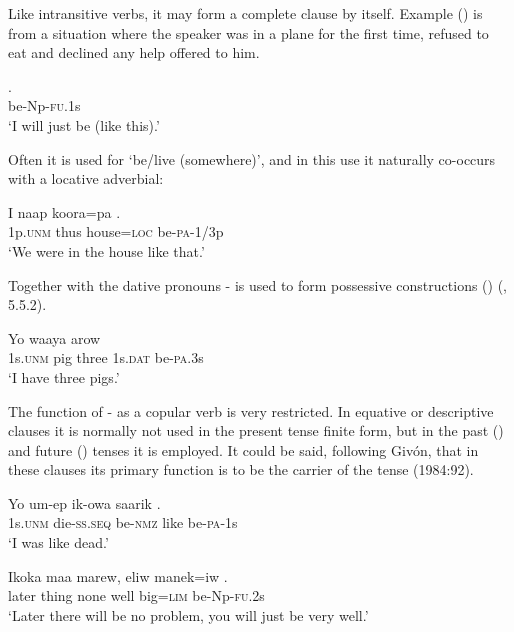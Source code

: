Like intransitive verbs, it may form a complete clause by itself. Example () is from a situation where the speaker was in a plane for the first time, refused to eat and declined any help offered to him.

\ea%
\label{ex:x1455}
\gll {}. \\
be-Np-\textsc{fu}.1s\\
\glt`I will just be (like this).'
\z

Often it is used for `be/live (somewhere)', and in this use it naturally co-occurs with a locative adverbial:

\ea%
\label{ex:x497}
\gll I naap koora=pa . \\
1p.\textsc{unm} thus house=\textsc{loc} be-\textsc{pa}-1/3p\\
\glt`We were in the house like that.'
\z

Together with the dative pronouns - is used to form possessive constructions () (, 5.5.2). 

\ea%
\label{ex:x258}
\gll Yo waaya arow   \\
1s.\textsc{unm} pig three 1s.\textsc{dat} be-\textsc{pa}.3s \\
\glt`I have three pigs.'
\z

The function of - as a copular verb is very restricted. In equative or descriptive clauses it is normally not used in the present tense finite form, but in the past () and future () tenses it is employed. It could be said, following Giv\'on, that in these clauses its primary function is to be the carrier of the tense (1984:92). 

\ea%
\label{ex:x259}
\gll Yo um-ep ik-owa saarik . \\
1s.\textsc{unm} die-\textsc{ss}.\textsc{seq} be-\textsc{nmz} like be-\textsc{pa}-1s\\
\glt`I was like dead.'
\z

\ea%
\label{ex:x1070}
\gll Ikoka maa marew, eliw manek=iw . \\
later thing none well big=\textsc{lim} be-Np-\textsc{fu}.2s\\
\glt`Later there will be no problem, you will just be very well.'
\z

